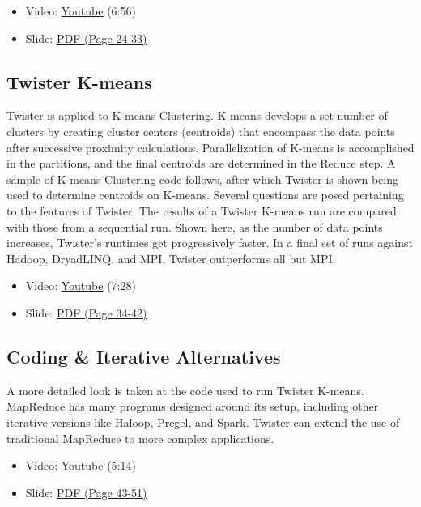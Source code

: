 \begin{itemize}

\item
  Video: \href{https://www.youtube.com/watch?v=n7RVGrC-wcs}{Youtube}
  (6:56)
\item
  Slide:
  \href{https://drive.google.com/open?id=0B88HKpainTSfMFBaNHprbWJwQms}{PDF
  (Page 24-33)}
\end{itemize}

\subsection{Twister K-means}\label{twister-k-means}

Twister is applied to K-means Clustering. K-means develops a set number
of clusters by creating cluster centers (centroids) that encompass the
data points after successive proximity calculations. Parallelization of
K-means is accomplished in the partitions, and the final centroids are
determined in the Reduce step. A sample of K-means Clustering code
follows, after which Twister is shown being used to determine centroids
on K-means. Several questions are posed pertaining to the features of
Twister. The results of a Twister K-means run are compared with those
from a sequential run. Shown here, as the number of data points
increases, Twister's runtimes get progressively faster. In a final set
of runs against Hadoop, DryadLINQ, and MPI, Twister outperforms all but
MPI.

\begin{itemize}

\item
  Video: \href{https://www.youtube.com/watch?v=-G5jlzABo-Y}{Youtube}
  (7:28)
\item
  Slide:
  \href{https://drive.google.com/open?id=0B88HKpainTSfMFBaNHprbWJwQms}{PDF
  (Page 34-42)}
\end{itemize}

\subsection{Coding \& Iterative
Alternatives}\label{coding-iterative-alternatives}

A more detailed look is taken at the code used to run Twister K-means.
MapReduce has many programs designed around its setup, including other
iterative versions like Haloop, Pregel, and Spark. Twister can extend
the use of traditional MapReduce to more complex applications.

\begin{itemize}

\item
  Video: \href{https://www.youtube.com/watch?v=QTCpiwnwjvo}{Youtube}
  (5:14)
\item
  Slide:
  \href{https://drive.google.com/open?id=0B88HKpainTSfMFBaNHprbWJwQms}{PDF
  (Page 43-51)}
\end{itemize}
